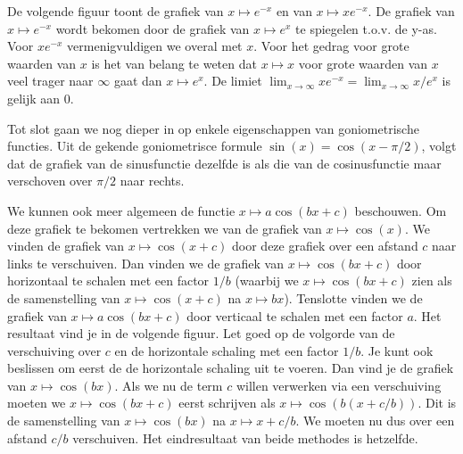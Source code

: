 \documentclass{ximera}
\begin{document}
\newpage

De volgende figuur toont de grafiek van $x\mapsto e^{-x}$ en van
$x\mapsto x e^{-x}$. De
grafiek van $x\mapsto e^{-x}$ wordt bekomen door de grafiek van
$x\mapsto e^x$ te
spiegelen t.o.v. de y-as. Voor $xe^{-x}$ vermenigvuldigen we
overal met $x$. Voor het gedrag voor grote waarden van $x$ is het van
belang te weten dat $x\mapsto x$ voor grote waarden van $x$ veel
trager naar $\infty$ gaat dan $x\mapsto e^{x}$. De limiet
$\lim_{x\rightarrow\infty} x e^{-x} = \lim_{x\rightarrow\infty} x/e^x$
is gelijk aan $0$.


\newpage

Tot slot gaan we nog dieper in op enkele eigenschappen van
goniometrische functies. Uit de gekende goniometrisce formule
$\sin(x)=\cos(x-\pi/2)$, volgt dat de grafiek van de sinusfunctie
dezelfde is als die van de cosinusfunctie maar verschoven over $\pi/2$
naar rechts.

We kunnen ook meer algemeen de functie $x\mapsto a \cos(b x + c)$
beschouwen. Om deze grafiek te bekomen vertrekken we van de grafiek
van $x\mapsto\cos(x)$. We vinden de grafiek van $x\mapsto\cos(x+c)$
door deze grafiek over een afstand $c$ naar links te verschuiven. Dan
vinden we de grafiek van $x\mapsto\cos(b x + c)$ door horizontaal te
schalen met een factor $1/b$ (waarbij we $x\mapsto\cos(bx+c)$ zien
als de samenstelling van $x\mapsto\cos(x+c)$ na $x\mapsto
bx$). Tenslotte vinden we de grafiek van $x\mapsto a\cos(bx+c)$ door
verticaal te schalen met een factor $a$. Het resultaat vind je in
de volgende figuur. Let goed op de volgorde van de verschuiving over
$c$ en de horizontale schaling met een factor $1/b$. Je kunt ook
beslissen om eerst de de horizontale schaling uit te voeren. Dan
vind je de grafiek van $x\mapsto\cos(bx)$. Als we nu de term $c$
willen verwerken via een verschuiving moeten we $x\mapsto\cos(bx+c)$
eerst schrijven als $x\mapsto\cos(b(x+c/b))$. Dit is de samenstelling
van $x\mapsto\cos(bx)$ na $x\mapsto x+c/b$. We moeten nu dus over
een afstand $c/b$ verschuiven. Het eindresultaat van beide methodes is
hetzelfde.


\newpage
\end{document}
